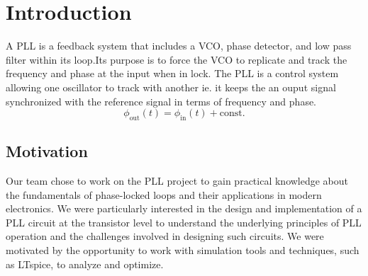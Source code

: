 \chapter{Introduction}
 A PLL is a feedback system that includes a VCO, phase detector, and low pass filter within its loop.Its purpose is to force the VCO to replicate and track the frequency and phase at the input when in lock. The PLL is a control system allowing one oscillator to track with another ie. it keeps the an ouput signal synchronized with the reference signal in terms of frequency and phase.
\begin{equation}
    \label{eq:pll_1}
    \phi_{\text{out}}(t) = \phi_{\text{in}}(t) + \text{const.}
\end{equation}

\section{Motivation}
Our team chose to work on the PLL project to gain practical knowledge about the fundamentals of phase-locked loops and their applications in modern electronics. We were particularly interested in the design and implementation of a PLL circuit at the transistor level to understand the underlying principles of PLL operation and the challenges involved in designing such circuits. We were motivated by the opportunity to work with simulation tools and techniques, such as LTspice, to analyze and optimize.

